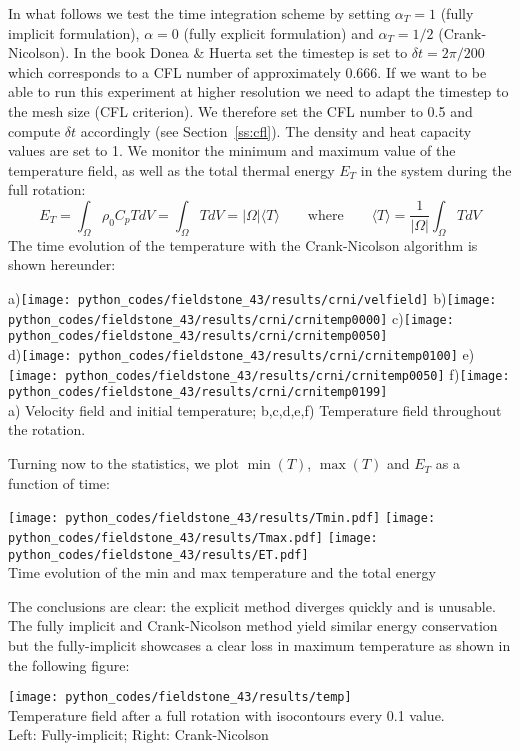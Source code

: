 In what follows we test the time integration scheme by setting $\alpha_T=1$ (fully implicit formulation), $\alpha=0$ (fully explicit formulation) and $\alpha_T=1/2$ (Crank-Nicolson).  
In the book Donea \& Huerta set the timestep is set to $\delta t=2\pi/200$ which corresponds to a CFL number of approximately 0.666. If we want to be able to run this experiment at higher 
resolution we need to adapt the timestep to the mesh size (CFL criterion). We therefore set the CFL number to 0.5 and compute $\delta t$ accordingly (see Section~\ref{ss:cfl}).  
The density and heat capacity values are set to 1. We monitor the minimum and maximum value of the temperature field, as well as the total thermal energy $E_T$ in the 
system during the full rotation:
\[
E_T=\int_\Omega \rho_0 C_p T dV = \int_\Omega T dV = |\Omega| \langle T \rangle 
\qquad
\text{where}
\qquad
\langle T \rangle = \frac{1}{|\Omega|} \int_\Omega T dV
\]
The time evolution of the temperature with the Crank-Nicolson algorithm is shown hereunder:
\begin{center}
a)\texttt{[image: python\_codes/fieldstone\_43/results/crni/velfield]}
b)\texttt{[image: python\_codes/fieldstone\_43/results/crni/crnitemp0000]}
c)\texttt{[image: python\_codes/fieldstone\_43/results/crni/crnitemp0050]}\\
d)\texttt{[image: python\_codes/fieldstone\_43/results/crni/crnitemp0100]}
e)\texttt{[image: python\_codes/fieldstone\_43/results/crni/crnitemp0050]}
f)\texttt{[image: python\_codes/fieldstone\_43/results/crni/crnitemp0199]}\\
{\small a) Velocity field and initial temperature; b,c,d,e,f) Temperature field throughout the rotation.} 
\end{center}
Turning now to the statistics, we plot $\min(T)$, $\max(T)$ and $E_T$ as a function of time:
\begin{center}
\texttt{[image: python\_codes/fieldstone\_43/results/Tmin.pdf]}
\texttt{[image: python\_codes/fieldstone\_43/results/Tmax.pdf]}
\texttt{[image: python\_codes/fieldstone\_43/results/ET.pdf]}\\
{\small Time evolution of the min and max temperature and the total energy}
\end{center}
The conclusions are clear: the explicit method diverges quickly and is unusable. The fully implicit and Crank-Nicolson 
method yield similar energy conservation but the fully-implicit showcases a clear loss in maximum temperature as shown in the following figure:
\begin{center}
\texttt{[image: python\_codes/fieldstone\_43/results/temp]}\\
{\small Temperature field after a full rotation with isocontours every 0.1 value.\\ Left: Fully-implicit; Right: Crank-Nicolson}
\end{center}

